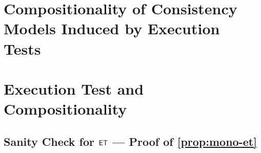 \ifTechReport
\section{Compositionality of Consistency Models Induced by Execution Tests}
\else
\section{Execution Test and Compositionality}
\subsection{Sanity Check for \( \mathsf{ET} \) --- Proof of \cref{prop:mono-et} }

\label{sec:mono-et}
\fi




